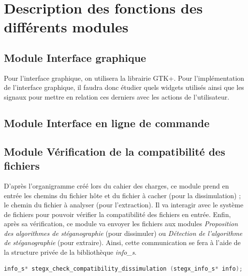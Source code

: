 \documentclass[11pt]{article}
\begin{document}
\section{Description des fonctions des différents modules}

\subsection{Module Interface graphique}

Pour l'interface graphique, on utilisera la librairie GTK+. Pour l'implémentation 
de l'interface graphique, il faudra donc étudier quels widgets utilisés 
ainsi que les signaux pour mettre en relation ces derniers avec les 
actions de l'utilisateur. 

\subsection{Module Interface en ligne de commande}

\subsection{Module Vérification de la compatibilité des fichiers}

D'après l'organigramme créé lors du cahier des charges, ce module prend en 
entrée les chemins du fichier hôte et du fichier à cacher (pour la dissimulation) ; 
le chemin du fichier à analyser (pour l'extraction). Il va interagir avec 
le système de fichiers pour pouvoir vérifier la compatibilité des fichiers en entrée. 
Enfin, après sa vérification, ce module va envoyer les fichiers aux modules 
\textit{Proposition des algorithmes de stéganographie} (pour dissimuler) ou 
\textit{Détection de l'algorithme de stéganographie} (pour extraire). 
Ainsi, cette communication se fera à l'aide de la structure privée de la 
bibliothèque \textit{info\_s}. 
\newline

\begin{lstlisting}[language=c]
info_s* stegx_check_compatibility_dissimulation (stegx_info_s* info);
\end{lstlisting}
\end{document}
